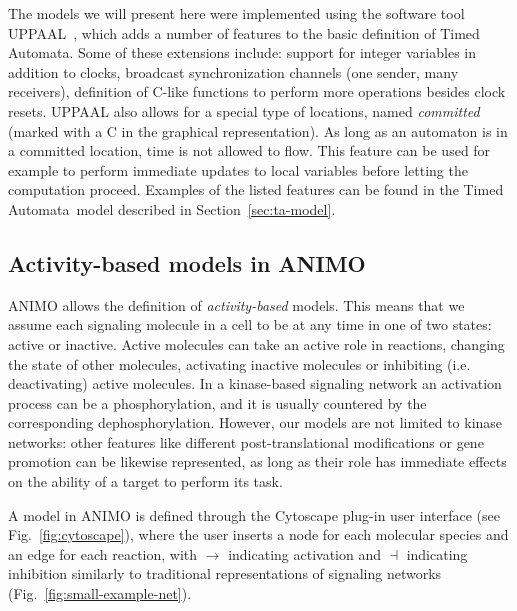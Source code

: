 \documentclass{llncs}
\newcommand{\tas}{Timed Automata}
\begin{document}
The models we will present here were implemented using the software tool UPPAAL~\cite{uppaal}, which adds a number of features
to the basic definition of \tas. Some of these extensions include: support for integer variables in addition to clocks,
broadcast synchronization channels (one sender, many receivers), definition of C-like functions to perform more 
operations besides clock resets.
UPPAAL also allows for a special type of locations, named \emph{committed} (marked with a {\sf C} in the graphical representation).
As long as an automaton is in a committed location, time is not allowed to flow. This feature can be used for example to perform immediate
updates to local variables before letting the computation proceed. Examples of the listed features can be found in the
\tas\ model described in Section~\ref{sec:ta-model}.


\subsection{Activity-based models in ANIMO}\label{sec:animo-old}
ANIMO allows the definition of \emph{activity-based} models. This means that we assume each signaling molecule in a
cell to be at any time in one of two states: active or inactive. Active molecules can take an active role in reactions,
changing the state of other molecules, activating inactive molecules or inhibiting (i.e. deactivating) active molecules.
In a kinase-based signaling network an activation process can be
a phosphorylation, and it is usually countered by the corresponding dephosphorylation. However, 
our models are not limited to kinase networks: other features like different post-translational
modifications or gene promotion can be likewise represented, as long as their role has immediate effects on the ability of a
target to perform its task.

A model in ANIMO is defined through the Cytoscape plug-in user interface (see Fig.~\ref{fig:cytoscape}), where the user inserts
a node for each molecular species and an edge for each reaction, with $\rightarrow$ indicating activation
and $\dashv$ indicating inhibition similarly to traditional representations of signaling networks (Fig.~\ref{fig:small-example-net}).
\end{document}
